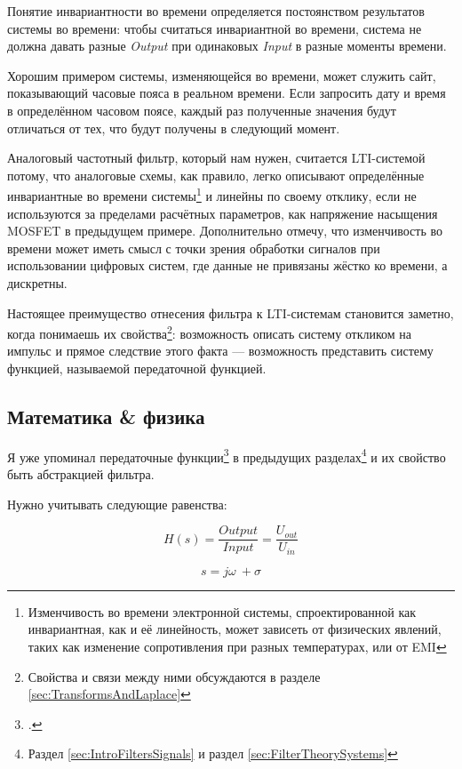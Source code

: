 \documentclass[a4paper, 10pt, final]{article} %
\begin{document}
    Понятие инвариантности во времени определяется постоянством результатов системы во времени: чтобы считаться инвариантной во времени, система не должна давать разные \emph{Output} при одинаковых \emph{Input} в разные моменты времени.

    Хорошим примером системы, изменяющейся во времени, может служить сайт, показывающий часовые пояса в реальном времени.
    Если запросить дату и время в определённом часовом поясе, каждый раз полученные значения будут отличаться от тех, что будут получены в следующий момент.


    Аналоговый частотный фильтр, который нам нужен, считается LTI-системой потому, что аналоговые схемы, как правило, легко описывают определённые инвариантные во времени системы\footnote{Изменчивость во времени электронной системы, спроектированной как инвариантная, как и её линейность, может зависеть от физических явлений, таких как изменение сопротивления при разных температурах, или от EMI} и линейны по своему отклику, если не используются за пределами расчётных параметров, как напряжение насыщения MOSFET в предыдущем примере.
    Дополнительно отмечу, что изменчивость во времени может иметь смысл с точки зрения обработки сигналов при использовании цифровых систем, где данные не привязаны жёстко ко времени, а дискретны.

    Настоящее преимущество отнесения фильтра к LTI-системам становится заметно, когда понимаешь их свойства\footnote{Свойства и связи между ними обсуждаются в разделе \ref{sec:TransformsAndLaplace}}: возможность описать систему откликом на импульс и прямое следствие этого факта --- возможность представить систему функцией, называемой передаточной функцией.
    \clearpage

    \subsection{Математика \& физика} \label{sec:MathAndPhysics}
    Я уже упоминал передаточные функции\footcite[]{TransferFunction:Wiki} в предыдущих разделах\footnote{Раздел \ref{sec:IntroFiltersSignals} и раздел \ref{sec:FilterTheorySystems}} и их свойство быть абстракцией фильтра.
    \begin{samepage}
        Нужно учитывать следующие равенства:
        \begin{figure}[H]
            \centering
            \begin{minipage}[b]{.35\linewidth}
                \centering
                \[
                    H(s) = \frac{Output}{Input} = \frac{U_{out}}{U_{in}}
                \]
            \end{minipage}
            \begin{minipage}[b]{.35\linewidth}
                \centering
                \[
                    s = j\omega\ + \sigma
                \]
            \end{minipage}
        \end{figure}
    \end{samepage}
\end{document}
